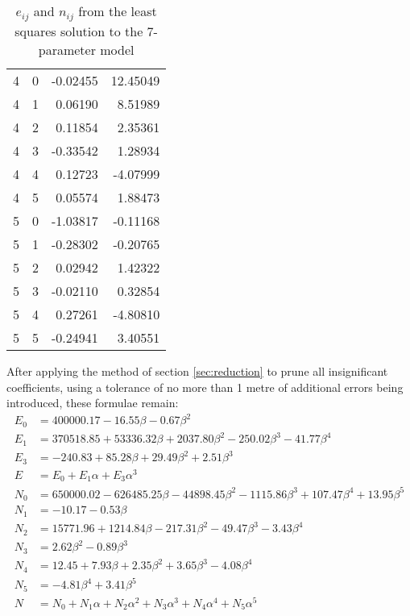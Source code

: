 \documentclass[10pt,a4paper]{article}
\begin{document}
\begin{table}
\begin{tabular}{l l r r}
4 & 0 &        -0.02455 &        12.45049 \\
4 & 1 &         0.06190 &         8.51989 \\
4 & 2 &         0.11854 &         2.35361 \\
4 & 3 &        -0.33542 &         1.28934 \\
4 & 4 &         0.12723 &        -4.07999 \\
4 & 5 &         0.05574 &         1.88473 \\
5 & 0 &        -1.03817 &        -0.11168 \\
5 & 1 &        -0.28302 &        -0.20765 \\
5 & 2 &         0.02942 &         1.42322 \\
5 & 3 &        -0.02110 &         0.32854 \\
5 & 4 &         0.27261 &        -4.80810 \\
5 & 5 &        -0.24941 &         3.40551 \\
\bottomrule
\end{tabular}
\caption{$e_{ij}$ and $n_{ij}$ from the least squares solution to the 7-parameter model}
\label{tbl:raw_lsq_helmert}
\hrulefill
\end{table}

After applying the method of section \ref{sec:reduction} to prune all
insignificant coefficients, using a tolerance of no more than 1 metre of
additional errors being introduced, these formulae remain:
\begin{align}
E_0 &= 400000.17 -16.55\beta -0.67\beta^2\nonumber \\
E_1 &= 370518.85 +53336.32\beta +2037.80\beta^2 -250.02\beta^3 -41.77\beta^4\nonumber \\
E_3 &= -240.83 +85.28\beta +29.49\beta^2 +2.51\beta^3\nonumber \\
E &= E_0 +E_1\alpha +E_3\alpha^3
  \label{eqn:untrimmed_east}
\\[1ex]
N_0 &= 650000.02 -626485.25\beta -44898.45\beta^2 -1115.86\beta^3 +107.47\beta^4 +13.95\beta^5\nonumber \\
N_1 &= -10.17 -0.53\beta\nonumber \\
N_2 &= 15771.96 +1214.84\beta -217.31\beta^2 -49.47\beta^3 -3.43\beta^4\nonumber \\
N_3 &= 2.62\beta^2 -0.89\beta^3\nonumber \\
N_4 &= 12.45 +7.93\beta +2.35\beta^2 +3.65\beta^3 -4.08\beta^4\nonumber \\
N_5 &= -4.81\beta^4 +3.41\beta^5\nonumber \\
N &= N_0 +N_1\alpha +N_2\alpha^2 +N_3\alpha^3 +N_4\alpha^4 +N_5\alpha^5
  \label{eqn:untrimmed_north}
\end{align}
\end{document}
